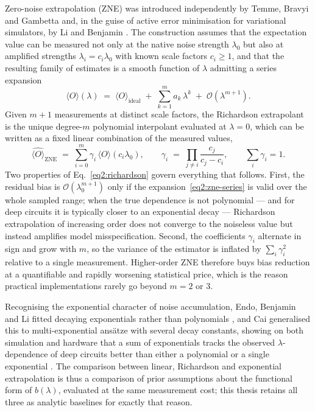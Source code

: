 \documentclass[Thesis.tex]{subfiles}
\begin{document}
Zero-noise extrapolation (ZNE) was introduced independently by Temme, Bravyi
and Gambetta \cite{temme2017error} and, in the guise of active error
minimisation for variational simulators, by Li and Benjamin
\cite{li2017efficient}. The construction assumes that the expectation value
can be measured not only at the native noise strength $\lambda_{0}$ but also at
amplified strengths $\lambda_{i} = c_{i}\lambda_{0}$ with known scale factors
$c_{i} \ge 1$, and that the resulting family of estimates is a smooth function
of $\lambda$ admitting a series expansion
\begin{equation}
  \langle O\rangle(\lambda) \;=\; \langle O\rangle_{\mathrm{ideal}}
  \;+\; \sum_{k=1}^{m} a_{k}\,\lambda^{k} \;+\; \mathcal{O}(\lambda^{m+1}).
  \label{eq2:zne-series}
\end{equation}
Given $m+1$ measurements at distinct scale factors, the Richardson
extrapolant is the unique degree-$m$ polynomial interpolant evaluated at
$\lambda = 0$, which can be written as a fixed linear combination of the
measured values,
\begin{equation}
  \widehat{\langle O\rangle}_{\mathrm{ZNE}} \;=\; \sum_{i=0}^{m} \gamma_{i}\,\langle O\rangle(c_{i}\lambda_{0}),
  \qquad
  \gamma_{i} \;=\; \prod_{j \ne i} \frac{c_{j}}{c_{j}-c_{i}},
  \qquad \sum_{i} \gamma_{i} = 1 .
  \label{eq2:richardson}
\end{equation}
Two properties of Eq.~\eqref{eq2:richardson} govern everything that follows.
First, the residual bias is
$\mathcal{O}(\lambda_{0}^{m+1})$ only if the expansion~\eqref{eq2:zne-series}
is valid over the whole sampled range; when the true dependence is not
polynomial --- and for deep circuits it is typically closer to an exponential
decay --- Richardson extrapolation of increasing order does not converge to
the noiseless value but instead amplifies model misspecification. Second, the
coefficients $\gamma_{i}$ alternate in sign and grow with $m$, so the variance
of the estimator is inflated by
$\sum_{i}\gamma_{i}^{2}$ relative to a single measurement. Higher-order ZNE
therefore buys bias reduction at a quantifiable and rapidly worsening
statistical price, which is the reason practical implementations rarely go
beyond $m = 2$ or $3$.

Recognising the exponential character of noise accumulation, Endo, Benjamin and
Li fitted decaying exponentials rather than polynomials
\cite{endo2018practical}, and Cai generalised this to multi-exponential
ans\"atze with several decay constants, showing on both simulation and hardware
that a sum of exponentials tracks the observed $\lambda$-dependence of deep
circuits better than either a polynomial or a single exponential
\cite{cai2021multiexponential}. The comparison between linear, Richardson and
exponential extrapolation is thus a comparison of prior assumptions about the
functional form of $b(\lambda)$, evaluated at the same measurement cost; this
thesis retains all three as analytic baselines for exactly that reason.
\end{document}
